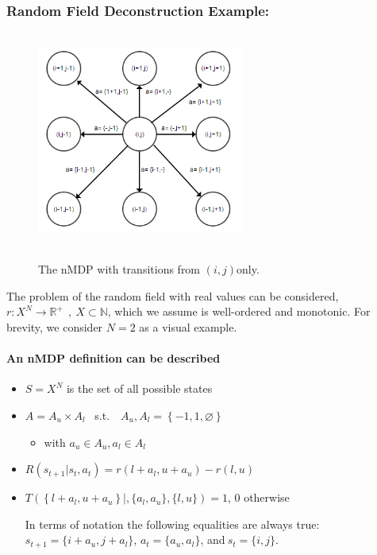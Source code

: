 \documentclass[compsoc,journal,letterpaper,10pt,draftclsnofoot,onecolumn]{IEEEtran}
\let\oldparagraph\paragraph
\renewcommand{\paragraph}[1]{\oldparagraph{#1}\mbox{}}
\begin{document}
\subsubsection{Random Field Deconstruction
Example:}\label{random-field-deconstruction-example}

\begin{figure}
\includegraphics[width=2.68750in,height=2.80556in]{media/image1.png}\\
\caption{\label{fig:figure1}The nMDP with transitions from \((i,j)\)only.}
\end{figure}

The
problem of the random field with real values can be considered,
\(r:X^{N} \rightarrow \mathbb{R}^{+}\ \ ,\ X\mathbb{\subset N}\), which
we assume is well-ordered and monotonic. For brevity, we consider
\(N = 2\) as a visual example.

\paragraph{An nMDP definition can be
described}\label{an-nmdp-definition-can-be-described}

\begin{itemize}
\item
  \(S = X^{N}\) is the set of all possible states
\item
  \(A = A_{u} \times A_{l} \) \ s.t.\  \ 
  \( A_{u}, A_{l} = \left\{ - 1,1,\varnothing \right\}\)

  \begin{itemize}
  \item
    with \(a_{u} \in A_{u}, a_{l} \in A_{l}\)
  \end{itemize}
\item
  \(R\left( s_{t + 1}|s_{t}, a_{t} \right) = r\left( l + a_{l}, u + a_{u} \right) - r(l,u)\)
\item
  \(T\left( \left\{ l + a_{l},u + a_{u} \right\}|,\{ a_{l},a_{u}\},\{ l,u\} \right) = 1\),
  \(0\) otherwise

  In terms of notation the following equalities are always true:
  \(s_{t + 1} = \{ i + a_{u}, j + a_{l}\}\), \(a_{t} = \{ a_{u},a_{l}\}\), and\(\ s_{t} = \{ i,j\}\).
\end{itemize}
\end{document}
